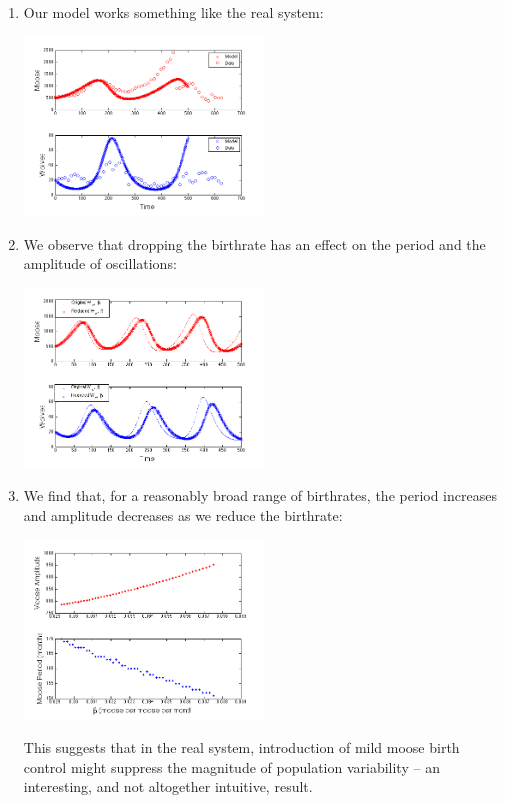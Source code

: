 \begin{enumerate} 
\item Our model works something like the real system:

\beforefig

\centerline{\includegraphics[width=2.5in]{figs/ModelDataComparison}} 


 
\item We observe that dropping the birthrate has an effect on the period and the amplitude of oscillations:

\beforefig

\centerline{\includegraphics[width=2.5in]{figs/MooseBCTimeSeries}}

\item We find that, for a reasonably broad range of birthrates, the period increases and amplitude decreases as we reduce the birthrate:

\beforefig

\centerline{\includegraphics[width=2.5in]{figs/MooseBCSweepClean}}

  This suggests that in the real system, introduction of mild moose birth control might suppress the magnitude of population variability -- an interesting, and not altogether intuitive, result.


\end{enumerate}

